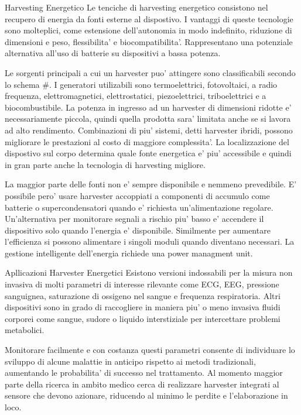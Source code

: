 \begin{multicols}{2}
\begin{section}{Harvesting Energetico}
    Le tenciche di harvesting energetico consistono nel recupero di energia da fonti esterne al dispostivo. I vantaggi di queste tecnologie sono molteplici, come estensione dell'autonomia in modo indefinito, riduzione di dimensioni e peso, flessibilita' e biocompatibilita'. Rappresentano una potenziale alternativa all'uso di batterie su dispositivi a bassa potenza.

    Le sorgenti principali a cui un harvester puo' attingere sono classificabili secondo lo schema \#. I generatori utilizabili sono termoelettrici, fotovoltaici, a radio frequenza, elettromagnetici, elettrostatici, piezoelettrici, triboelettrici e a biocombustibile. La potenza in ingresso ad un harvester di dimensioni ridotte e' necessariamente piccola, quindi quella prodotta sara' limitata anche se si lavora ad alto rendimento. Combinazioni di piu' sistemi, detti harvester ibridi, possono migliorare le prestazioni al costo di maggiore complessita'. La localizzazione del dispostivo sul corpo determina quale fonte energetica e' piu' accessibile e quindi in gran parte anche la tecnologia di harvesting migliore. 
    
    La maggior parte delle fonti non e' sempre disponibile e nemmeno prevedibile. E' possibile pero' usare harvester accoppiati a componenti di accumulo come batterie o supercondensatori quando e' richiesta un'alimentazione regolare. Un'alternativa per monitorare segnali a rischio piu' basso e' accendere il dispositivo solo quando l'energia e' disponibile. Similmente per aumentare l'efficienza si possono alimentare i singoli moduli quando diventano necessari. La gestione intelligente dell'energia richiede una power managment unit.
\end{section}

\begin{section}{Apllicazioni Harvester Energetici}
    Esistono versioni indossabili per la misura non invasiva di molti parametri di interesse rilevante come ECG, EEG, pressione sanguignea, saturazione di ossigeno nel sangue e frequenza respiratoria. Altri dispositivi sono in grado di raccogliere in maniera piu' o meno invasiva fluidi corporei come sangue, sudore o liquido interstiziale per intercettare problemi metabolici. 
    
    Monitorare facilmente e con costanza questi parametri consente di individuare lo sviluppo di alcune malattie in anticipo rispetto ai metodi tradizionali, aumentando le probabilita' di successo nel trattamento. Al momento maggior parte della ricerca in ambito medico cerca di realizzare harvester integrati al sensore che devono azionare, riducendo al minimo le perdite e l'elaborazione in loco. 


\end{section}
\end{multicols}
